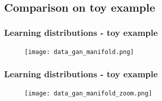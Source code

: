 \documentclass{Bredelebeamer}
\begin{document}
\subsection{Comparison on toy example}
\begin{frame}
	\frametitle{Learning distributions - toy example}
	\begin{figure}[h!]
		\centering
		\texttt{[image: data\_gan\_manifold.png]}
	\end{figure}
\end{frame}


\begin{frame}
	\frametitle{Learning distributions - toy example}
	\begin{figure}[h!]
		\centering
		\texttt{[image: data\_gan\_manifold\_zoom.png]}
	\end{figure}
\end{frame}
\end{document}
